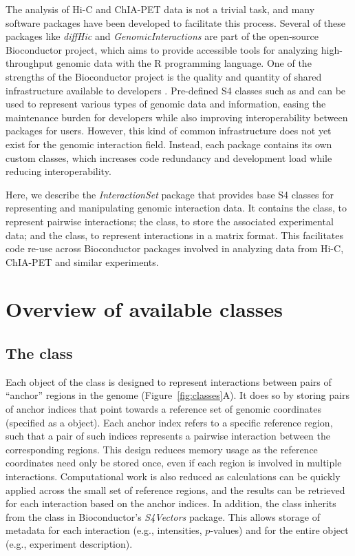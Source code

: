 \documentclass[10pt,a4paper,twocolumn]{article}
\begin{document}
The analysis of Hi-C and ChIA-PET data is not a trivial task, and many software packages have been developed to facilitate this process.
Several of these packages like \textit{diffHic} \cite{lun2015diffhic} and \textit{GenomicInteractions} \cite{harmston2015genomicinteractions} are part of the open-source Bioconductor project, which aims to provide accessible tools for analyzing high-throughput genomic data with the R programming language.
One of the strengths of the Bioconductor project is the quality and quantity of shared infrastructure available to developers \cite{huber2015orchestrating}.
Pre-defined S4 classes such as  and  can be used to represent various types of genomic data and information, easing the maintenance burden for developers while also improving interoperability between packages for users.
However, this kind of common infrastructure does not yet exist for the genomic interaction field.
Instead, each package contains its own custom classes, which increases code redundancy and development load while reducing interoperability.

Here, we describe the \textit{InteractionSet} package that provides base S4 classes for representing and manipulating genomic interaction data.
It contains the  class, to represent pairwise interactions; the  class, to store the associated experimental data; and the  class, to represent interactions in a matrix format.
This facilitates code re-use across Bioconductor packages involved in analyzing data from Hi-C, ChIA-PET and similar experiments.

\section*{Overview of available classes}

\subsection*{The  class}
Each object of the  class is designed to represent interactions between pairs of ``anchor'' regions in the genome (Figure~\ref{fig:classes}A).
It does so by storing pairs of anchor indices that point towards a reference set of genomic coordinates (specified as a  object).
Each anchor index refers to a specific reference region, such that a pair of such indices represents a pairwise interaction between the corresponding regions.
This design reduces memory usage as the reference coordinates need only be stored once, even if each region is involved in multiple interactions.
Computational work is also reduced as calculations can be quickly applied across the small set of reference regions, and the results can be retrieved for each interaction based on the anchor indices.
In addition, the  class inherits from the  class in Bioconductor's \textit{S4Vectors} package.
This allows storage of metadata for each interaction (e.g., intensities, $p$-values) and for the entire object (e.g., experiment description).
\end{document}
